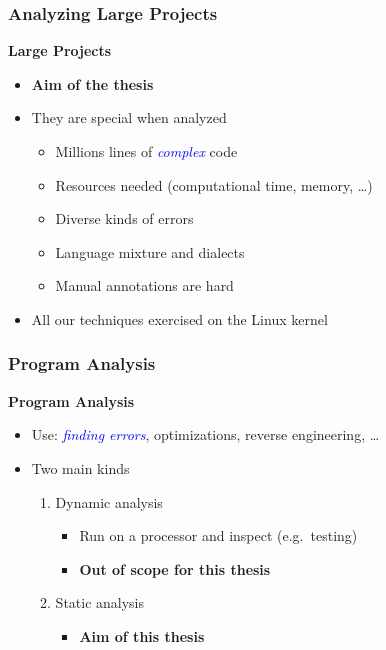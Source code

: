 \documentclass[xcolor=dvipsnames]{beamer}
\let\Oldemph\emph
\renewcommand{\emph}[1]{\textcolor{blue}{\Oldemph{#1}}}
\newcommand{\heading}[1]{\textbf{\textcolor{BurntOrange}{#1}}}
\begin{document}
\begin{frame}
  \frametitle{Analyzing Large Projects}

  \heading{Large Projects}
  \begin{itemize}
    \item \textbf{Aim of the thesis}

    \pause

    \item They are special when analyzed
    \begin{itemize}
      \item Millions lines of \emph{complex} code
      \item Resources needed (computational time, memory, \dots)
      \item Diverse kinds of errors
      \item Language mixture and dialects
      \item Manual annotations are hard
    \end{itemize}

    \pause

    \item All our techniques exercised on the Linux kernel
  \end{itemize}

\end{frame}

\begin{frame}
  \frametitle{Program Analysis}

  \heading{Program Analysis}
  \begin{itemize}
    \item Use: \emph{finding errors}, optimizations, reverse engineering, \dots

    \pause

    \item Two main kinds
    \begin{enumerate}
      \item Dynamic analysis
      \begin{itemize}
	\item Run on a processor and inspect (e.g.\ testing)
	\item \textbf{Out of scope for this thesis}
      \end{itemize}

      \pause

      \item Static analysis
      \begin{itemize}
	\item \textbf{Aim of this thesis}
      \end{itemize}
    \end{enumerate}
  \end{itemize}

\end{frame}
\end{document}
